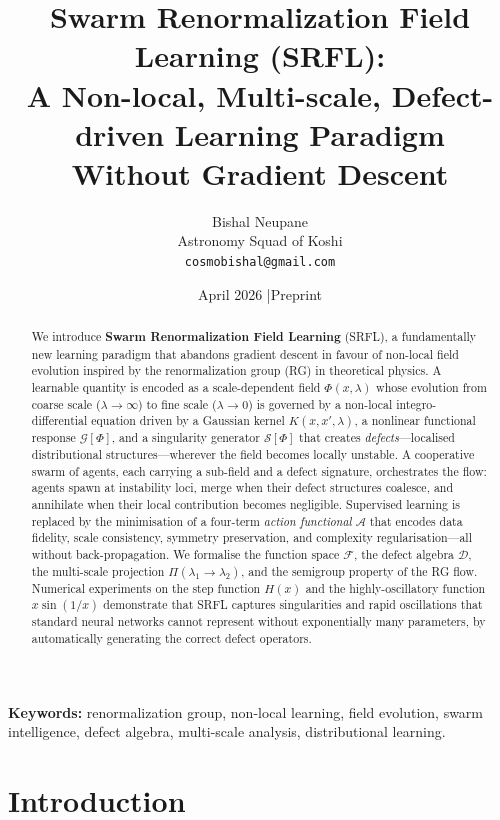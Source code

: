 \documentclass[12pt,a4paper]{article}
\title{%
  \textbf{Swarm Renormalization Field Learning (SRFL):}\\[4pt]
  \large A Non-local, Multi-scale, Defect-driven Learning Paradigm\\[2pt]
  \normalsize Without Gradient Descent
}
\author{%
  Bishal Neupane\\[2pt]
  \small Astronomy Squad of Koshi\\[1pt]
  \small \texttt{cosmobishal@gmail.com}
}
\date{April 2026 \quad|\quad Preprint}
\theoremstyle{plain}
\theoremstyle{definition}
\theoremstyle{remark}
\newcommand{\cF}{\mathcal{F}}
\newcommand{\cD}{\mathcal{D}}
\newcommand{\cG}{\mathcal{G}}
\newcommand{\cS}{\mathcal{S}}
\newcommand{\cA}{\mathcal{A}}
\begin{document}
\maketitle
\thispagestyle{empty}

\begin{abstract}
\noindent
We introduce \textbf{Swarm Renormalization Field Learning} (SRFL), a
fundamentally new learning paradigm that abandons gradient descent in
favour of non-local field evolution inspired by the renormalization group
(RG) in theoretical physics.  A learnable quantity is encoded as a
scale-dependent field $\Phi(x,\lambda)$ whose evolution from coarse
scale ($\lambda \to \infty$) to fine scale ($\lambda \to 0$) is governed
by a non-local integro-differential equation driven by a Gaussian kernel
$K(x,x',\lambda)$, a nonlinear functional response $\cG[\Phi]$, and a
singularity generator $\cS[\Phi]$ that creates \emph{defects}---localised
distributional structures---wherever the field becomes locally unstable.
A cooperative swarm of agents, each carrying a sub-field and a defect
signature, orchestrates the flow: agents spawn at instability loci, merge
when their defect structures coalesce, and annihilate when their local
contribution becomes negligible.  Supervised learning is replaced by the
minimisation of a four-term \emph{action functional} $\cA$ that encodes
data fidelity, scale consistency, symmetry preservation, and complexity
regularisation---all without back-propagation.  We formalise the function
space $\cF$, the defect algebra $\cD$, the multi-scale projection
$\Pi(\lambda_1\!\to\!\lambda_2)$, and the semigroup property of the RG
flow.  Numerical experiments on the step function $H(x)$ and the
highly-oscillatory function $x\sin(1/x)$ demonstrate that SRFL captures
singularities and rapid oscillations that standard neural networks cannot
represent without exponentially many parameters, by automatically
generating the correct defect operators.
\end{abstract}

\vspace{4pt}
\noindent\textbf{Keywords:}
renormalization group, non-local learning, field evolution, swarm intelligence,
defect algebra, multi-scale analysis, distributional learning.

\newpage
\tableofcontents
\newpage

\section{Introduction}
\label{sec:intro}
\end{document}
